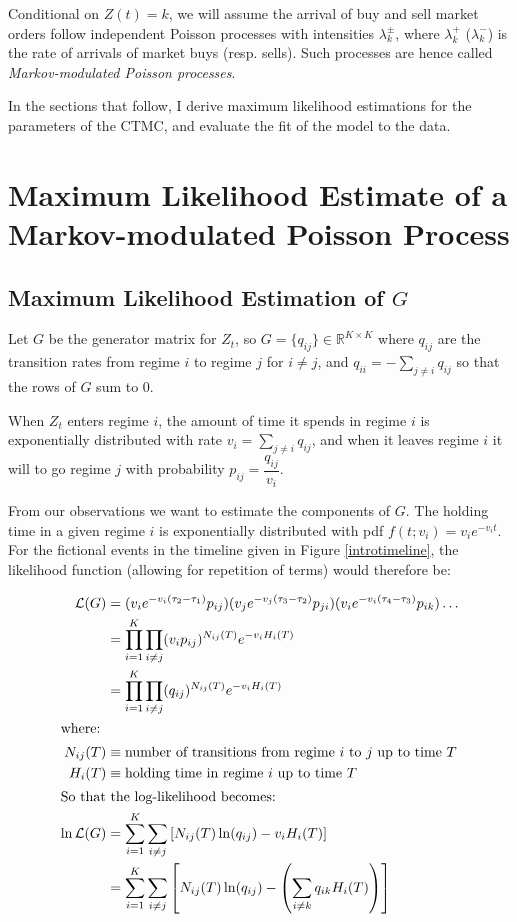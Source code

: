 Conditional on $Z(t) = k$, we will assume the arrival of buy and sell market orders follow independent Poisson processes with intensities $\lambda_k^\pm$, where $\lambda_k^+$ ($\lambda_k^-$) is the rate of arrivals of market buys (resp. sells). Such processes are hence called \textit{Markov-modulated Poisson processes}.

In the sections that follow, I derive maximum likelihood estimations for the parameters of the CTMC, and evaluate the fit of the model to the data.

\section{Maximum Likelihood Estimate of a Markov-modulated Poisson Process}

\subsection{Maximum Likelihood Estimation of \texorpdfstring{$G$}{G}}

Let $G$ be the generator matrix for $Z_t$, so $G = \{ q_{ij} \} \in \mathbb{R}^{K \times K}$ where $q_{ij}$ are the transition rates from regime $i$ to regime $j$ for $i\neq j$, and $q_{ii} = - \sum\limits_{j \neq i} q_{ij}$ so that the rows of $G$ sum to 0. 

When $Z_t$ enters regime $i$, the amount of time it spends in regime $i$ is exponentially distributed with rate $v_i = \sum\limits_{j \neq i} q_{ij}$, and when it leaves regime $i$ it will to go regime $j$ with probability $p_{ij} = \dfrac{q_{ij}}{v_i}$. 

From our observations we want to estimate the components of $G$. The holding time in a given regime $i$ is exponentially distributed with pdf $f(t;v_i) = v_i e^{-v_i t}$. For the fictional events in the timeline given in Figure \ref{introtimeline}, the likelihood function (allowing for repetition of terms) would therefore be:

\begin{align}
\mathcal{L}(G) &= (v_{i} e^{-v_{i}(\tau_2 - \tau_1)} p_{ij}) (v_{j} e^{-v_{j}(\tau_3 - \tau_2)} p_{ji}) (v_{i} e^{-v_{i}(\tau_4 - \tau_3)} p_{ik}) \dots \\
&= \prod\limits_{i=1}^{K} \prod\limits_{i \neq j} (v_{i}p_{ij})^{N_{ij}(T)} e^{-v_{i}H_i(T)} \\
&= \prod\limits_{i=1}^{K} \prod\limits_{i \neq j} (q_{ij})^{N_{ij}(T)} e^{-v_{i}H_i(T)} \\
\intertext{where:}
N_{ij}(T) & \equiv \mbox{number of transitions from regime $i$ to $j$ up to time $T$} \nonumber \\
H_{i}(T) & \equiv \mbox{holding time in regime $i$ up to time $T$} \nonumber \\
\intertext{So that the log-likelihood becomes:} 
\ln \mathcal{L}(G) & = \sum\limits_{i=1}^{K} \sum\limits_{i \neq j} \left[ N_{ij}(T) \ln(q_{ij}) - v_{i} H_i(T) \right] \\
&= \sum\limits_{i=1}^{K} \sum\limits_{i \neq j} \left[ N_{ij}(T) \ln(q_{ij}) - \left( \sum\limits_{i \neq k} q_{ik} H_i(T) \right) \right]
\end{align}


